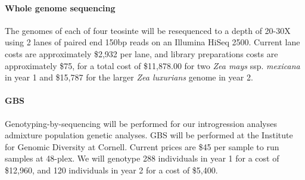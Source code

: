 \documentclass[11pt,letterpaper]{article}
\begin{document}
\paragraph{Whole genome sequencing}
The genomes of each of four teosinte will be resequenced to a depth of 20-30X using 2 lanes of paired end 150bp reads on an Illumina HiSeq 2500. Current lane costs are approximately \$2,932 per lane, and library preparations costs are approximately \$75, for a total cost of \$11,878.00 for two \emph{Zea mays} ssp. \emph{mexicana} in year 1 and \$15,787 for the larger \emph{Zea luxurians} genome in year 2.

\paragraph{GBS}
Genotyping-by-sequencing will be performed for our introgression analyses admixture population genetic analyses. GBS will be performed at the Institute for Genomic Diversity at Cornell.  Current prices are \$45 per sample to run samples at 48-plex.  We will genotype 288 individuals in year 1 for a cost of \$12,960, and 120 individuals in year 2 for a cost of \$5,400. 


\end{document}
